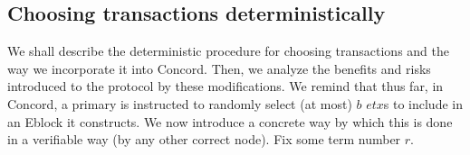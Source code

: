 \subsection{Choosing transactions deterministically}
We shall describe the deterministic procedure for choosing transactions and the way we incorporate it into Concord. Then, we analyze the benefits and risks introduced to the protocol by these modifications.
We remind that thus far, in Concord, a primary is instructed to randomly select (at most) $b$ $etx$s to include in an Eblock it constructs. We now introduce a concrete way by which this is done in a verifiable way (by any other correct node). Fix some term number $r$. 

